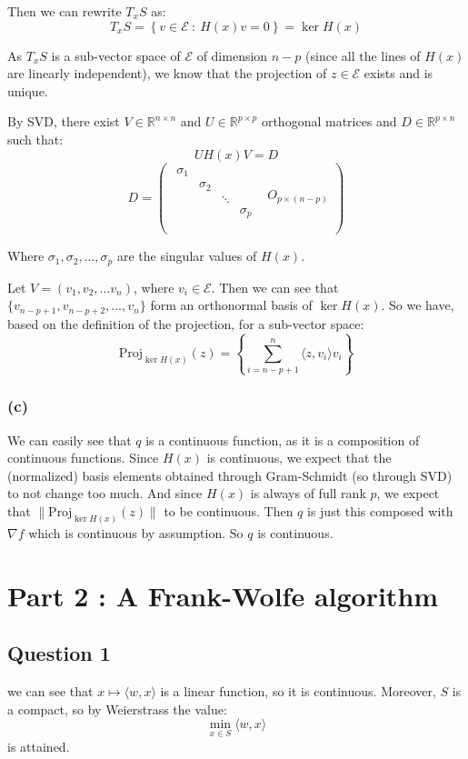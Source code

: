 \documentclass[12p]{article}
\newcommand*{\proj}{\text{Proj}}
\newcommand*{\es}{\mathcal{E}}
\begin{document}
Then we can rewrite \(T_xS\) as:
\[
  T_xS=\left\{v\in \es \ : \ H(x)v=0\right\} =\ker H(x)  
\]

As \(T_xS\) is a sub-vector space of \(\es\) of dimension \(n-p\) (since all the lines of \(H(x)\) are linearly independent), we know that the projection of \(z\in \es\) exists and is unique. 

By SVD, there exist \(V\in\mathbb{R}^{n\times n}\) and \(U\in\mathbb{R}^{p\times p}\) orthogonal matrices and \(D\in\mathbb{R}^{p\times n}\) such that:
\[
  UH(x)V=D
\]
\[
  D=\begin{pmatrix}
    \begin{matrix}
    \sigma_1 &  &  & \\
     & \sigma_2 &  & \\
     &  & \ddots & \\
     &  &  & \sigma_p\\
    \end{matrix} & O_{p\times(n-p)}\\
    \end{pmatrix}  
\]

Where \(\sigma_1,\sigma_2,\dots,\sigma_p\) are the singular values of \(H(x)\).

Let \(V=(v_1, v_2, \dots v_n)\), where \(v_i\in \es\). Then we can see that \(\{v_{n-p+1},v_{n-p+2},\dots,v_{n}\}\) form an orthonormal basis of \(\ker H(x)\). So we have, based on the definition of the projection, for a sub-vector space:
\[
  \proj_{\ker H(x)}(z)=\left\{\sum_{i=n-p+1}^{n}\langle z, v_i\rangle v_i\right\}
\]
\subsubsection*{(c)}\hfil\par
We can easily see that \(q\) is a continuous function, as it is a composition of continuous functions. Since \(H(x)\) is continuous, we expect that the (normalized) basis elements obtained through Gram-Schmidt (so through SVD) to not change too much. And since \(H(x)\) is always of full rank \(p\), we expect that \(\| \proj_{\ker H(x)}(z)\|\) to be continuous. Then \(q\) is just this composed with \(\nabla f\) which is continuous by assumption. So \(q\) is continuous.
\newpage


\section*{Part 2 : A Frank-Wolfe algorithm} 


\subsection*{Question 1}\hfil\par
we can see that \(x\mapsto \langle w, x\rangle\) is a linear function, so it is continuous. Moreover, \(S\) is a compact, so by Weierstrass the value:
\[
    \min_{x\in S}\langle w, x\rangle
\]
is attained.
\end{document}
